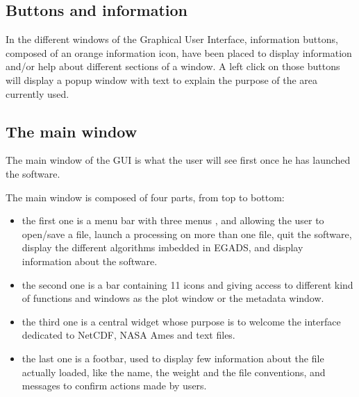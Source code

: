 \documentclass[a4paper,10pt,openany,english]{sphinxmanual}
\let\sphinxpxdimen\pdfpxdimen\else\newdimen\sphinxpxdimen
\begin{document}
\subsection{Buttons and information}
\label{\detokenize{description:buttons-and-information}}
In the different windows of the Graphical User Interface, information buttons, composed of an orange information icon, have been placed to display information and/or help about different sections of a window. A left click on those buttons will display a popup window with text to explain the purpose of the area currently used.


\subsection{The main window}
\label{\detokenize{description:the-main-window}}
The main window of the GUI is what the user will see first once he has launched the software.

\noindent{\hspace*{\fill}\sphinxincludegraphics[width=421.20000\sphinxpxdimen,height=265.05000\sphinxpxdimen]{{EGADS_GUI_000}.png}\hspace*{\fill}}

The main window is composed of four parts, from top to bottom:
\begin{itemize}
\item {} 
the first one is a menu bar with three menus \sphinxhyphen{} ,  and  \sphinxhyphen{} allowing the user to open/save a file, launch a processing on more than one file, quit the software, display the different algorithms imbedded in EGADS, and display information about the software.

\item {} 
the second one is a bar containing 11 icons and giving access to different kind of functions and windows as the plot window or the metadata window.

\item {} 
the third one is a central widget whose purpose is to welcome the interface dedicated to NetCDF, NASA Ames and text files.

\item {} 
the last one is a footbar, used to display few information about the file actually loaded, like the name, the weight and the file conventions, and messages to confirm actions made by users.

\end{itemize}
\end{document}
